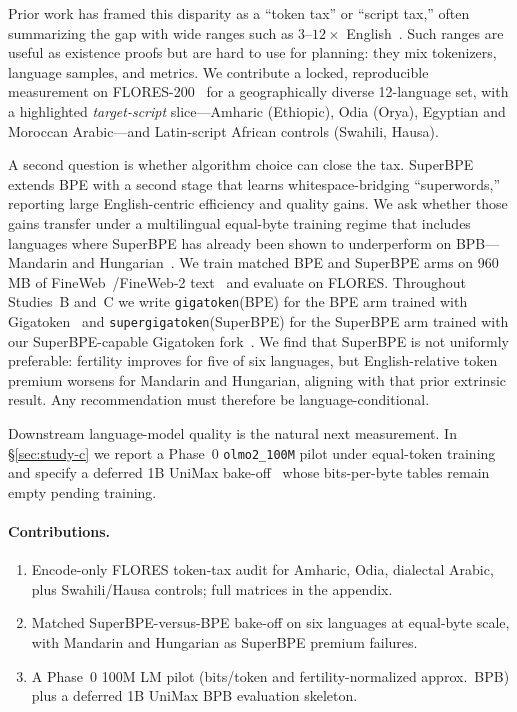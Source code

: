 \documentclass[11pt,a4paper]{article}
\begin{document}
Prior work has framed this disparity as a ``token tax'' or ``script tax,'' often summarizing the gap with wide ranges such as $3$--$12\times$ English~\citep{dixit2026scripttax,somide2026african,petrov2023unfairness}.
Such ranges are useful as existence proofs but are hard to use for planning: they mix tokenizers, language samples, and metrics.
We contribute a locked, reproducible measurement on FLORES-200~\citep{goyal2022flores,nllb2022} for a geographically diverse 12-language set, with a highlighted \emph{target-script} slice---Amharic (Ethiopic), Odia (Orya), Egyptian and Moroccan Arabic---and Latin-script African controls (Swahili, Hausa).

A second question is whether algorithm choice can close the tax.
SuperBPE~\citep{liu2025superbpe} extends BPE with a second stage that learns whitespace-bridging ``superwords,'' reporting large English-centric efficiency and quality gains.
We ask whether those gains transfer under a multilingual equal-byte training regime that includes languages where SuperBPE has already been shown to underperform on BPB---Mandarin and Hungarian~\citep{chowdhury-woolf-2026-benchmarking}.
We train matched BPE and SuperBPE arms on 960\,MB of FineWeb~/FineWeb-2 text~\citep{penedo2024fineweb,penedo2025fineweb2} and evaluate on FLORES.
Throughout Studies~B and~C we write \texttt{gigatoken}(BPE) for the BPE arm trained with Gigatoken~\citep{roed2026gigatoken} and \texttt{supergigatoken}(SuperBPE) for the SuperBPE arm trained with our SuperBPE-capable Gigatoken fork~\citep{verma2026supergigatoken}.
We find that SuperBPE is not uniformly preferable: fertility improves for five of six languages, but English-relative token premium worsens for Mandarin and Hungarian, aligning with that prior extrinsic result.
Any recommendation must therefore be language-conditional.

Downstream language-model quality is the natural next measurement.
In \S\ref{sec:study-c} we report a Phase~0 \texttt{olmo2\_100M} pilot under equal-token training and specify a deferred 1B UniMax bake-off~\citep{chung2023unimax} whose bits-per-byte tables remain empty pending training.

\paragraph{Contributions.}
\begin{enumerate}[leftmargin=*,itemsep=2pt]
  \item Encode-only FLORES token-tax audit for Amharic, Odia, dialectal Arabic, plus Swahili/Hausa controls; full matrices in the appendix.
  \item Matched SuperBPE-versus-BPE bake-off on six languages at equal-byte scale, with Mandarin and Hungarian as SuperBPE premium failures.
  \item A Phase~0 100M LM pilot (bits/token and fertility-normalized approx.\ BPB) plus a deferred 1B UniMax BPB evaluation skeleton.
\end{enumerate}
\end{document}
